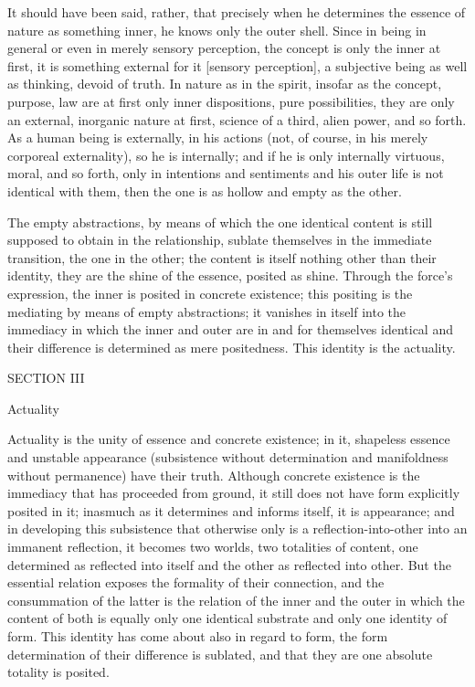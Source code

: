     It should have been said, rather,
    that precisely when he determines
    the essence of nature as something inner,
    he knows only the outer shell.
    Since in being in general
    or even in merely sensory perception,
    the concept is only the inner at first,
    it is something external for it [sensory perception],
    a subjective being as well as thinking, devoid of truth.
    In nature as in the spirit, insofar as
    the concept, purpose, law are at first
    only inner dispositions, pure possibilities,
    they are only an external, inorganic nature at first,
    science of a third, alien power, and so forth.
    As a human being is externally, in his actions
    (not, of course, in his merely corporeal externality),
    so he is internally;
    and if he is only internally virtuous, moral, and so forth,
    only in intentions and sentiments
    and his outer life is not identical with them,
    then the one is as hollow and empty as the other.

The empty abstractions, by means of which
the one identical content is still supposed
to obtain in the relationship,
sublate themselves in the immediate transition,
the one in the other;
the content is itself nothing other than their identity,
they are the shine of the essence, posited as shine.
Through the force's expression, the inner is posited in concrete existence;
this positing is the mediating by means of empty abstractions;
it vanishes in itself into the immediacy in which
the inner and outer are in and for themselves identical and
their difference is determined as mere positedness.
This identity is the actuality.

SECTION III

Actuality

Actuality is the unity of essence and concrete existence;
in it, shapeless essence and unstable appearance
(subsistence without determination
and manifoldness without permanence)
have their truth.
Although concrete existence is the immediacy
that has proceeded from ground,
it still does not have form explicitly posited in it;
inasmuch as it determines and informs itself, it is appearance;
and in developing this subsistence that otherwise only is
a reflection-into-other into an immanent reflection,
it becomes two worlds, two totalities of content,
one determined as reflected into itself
and the other as reflected into other.
But the essential relation exposes
the formality of their connection,
and the consummation of the latter is
the relation of the inner and the outer
in which the content of both is equally
only one identical substrate
and only one identity of form.
This identity has come about also in regard to form,
the form determination of their difference is sublated,
and that they are one absolute totality is posited.

